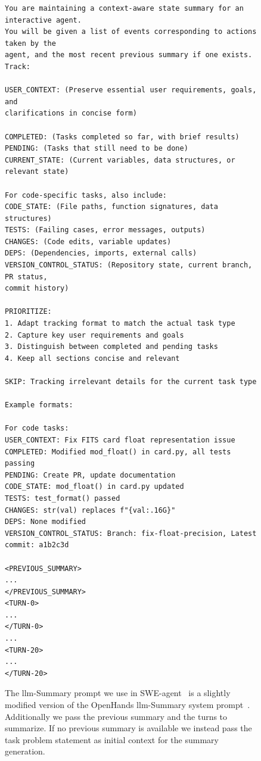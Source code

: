 \documentclass{article}
\begin{document}
\begin{figure}[th]
\begin{tcolorbox}[
  colback=jb_magenta_accent,
  colframe=jb_magenta,
  title=\ac{llm}-Summary Prompt, width=\textwidth
]
\begin{small}
\begin{verbatim}
You are maintaining a context-aware state summary for an interactive agent. 
You will be given a list of events corresponding to actions taken by the 
agent, and the most recent previous summary if one exists. Track:

USER_CONTEXT: (Preserve essential user requirements, goals, and 
clarifications in concise form)

COMPLETED: (Tasks completed so far, with brief results)
PENDING: (Tasks that still need to be done)
CURRENT_STATE: (Current variables, data structures, or relevant state)

For code-specific tasks, also include:
CODE_STATE: (File paths, function signatures, data structures)
TESTS: (Failing cases, error messages, outputs)
CHANGES: (Code edits, variable updates)
DEPS: (Dependencies, imports, external calls)
VERSION_CONTROL_STATUS: (Repository state, current branch, PR status, 
commit history)

PRIORITIZE:
1. Adapt tracking format to match the actual task type
2. Capture key user requirements and goals
3. Distinguish between completed and pending tasks
4. Keep all sections concise and relevant

SKIP: Tracking irrelevant details for the current task type

Example formats:

For code tasks:
USER_CONTEXT: Fix FITS card float representation issue
COMPLETED: Modified mod_float() in card.py, all tests passing
PENDING: Create PR, update documentation
CODE_STATE: mod_float() in card.py updated
TESTS: test_format() passed
CHANGES: str(val) replaces f"{val:.16G}"
DEPS: None modified
VERSION_CONTROL_STATUS: Branch: fix-float-precision, Latest commit: a1b2c3d

<PREVIOUS_SUMMARY>
...
</PREVIOUS_SUMMARY>
<TURN-0>
...
</TURN-0>
...
<TURN-20>
...
</TURN-20>
\end{verbatim}
\end{small}
\end{tcolorbox}
\caption{The \ac{llm}-Summary prompt we use in SWE-agent~\cite{yang_swe-agent_2024} is a slightly modified version of the OpenHands \ac{llm}-Summary system prompt~\cite{wang2025openhands}. Additionally we pass the previous summary and the turns to summarize. If no previous summary is available we instead pass the task problem statement as initial context for the summary generation.}
\label{fig:prompt:llm-summary}
\end{figure}
\end{document}

